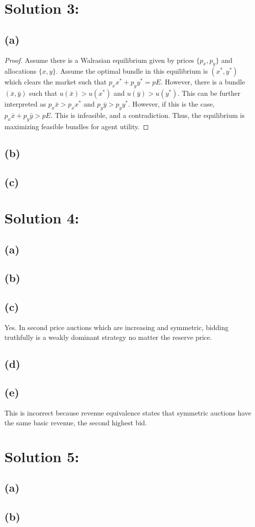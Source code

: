 \documentclass[10pt,a4paper]{article}
\begin{document}
\section*{Solution 3:}
  \subsection*{(a)}
    \begin{proof}
      Assume there is a Walrasian equilibrium given by prices $\{p_x,p_y\}$ and allocations $\{x,y\}$. Assume the optimal bundle in this equilibrium is $(x^*,y^*)$ which clears the market such that $p_xx^* + p_yy^* = pE$. However, there is a bundle $(\bar{x},\bar{y})$ such that $u(\bar{x})>u(x^*)$ and $u(\bar{y}) > u(y^*)$. This can be further interpreted as $p_x\bar{x} > p_xx^*$ and $p_y\bar{y} > p_yy^*$. However, if this is the case, $p_x\bar{x}+p_y\bar{y}>pE$. This is infeasible, and a contradiction. Thus, the equilibrium is maximizing feasible bundles for agent utility. 
    \end{proof}
  \subsection*{(b)}
    
  \subsection*{(c)}
\section*{Solution 4:}
  \subsection*{(a)}
  \subsection*{(b)}
  \subsection*{(c)}
    Yes. In second price auctions which are increasing and symmetric, bidding truthfully is a weakly dominant strategy no matter the reserve price.
  \subsection*{(d)}
  \subsection*{(e)}
    This is incorrect because revenue equivalence states that symmetric auctions have the same basic revenue, the second highest bid.
\section*{Solution 5:}
  \subsection*{(a)}
  \subsection*{(b)}
\end{document}
